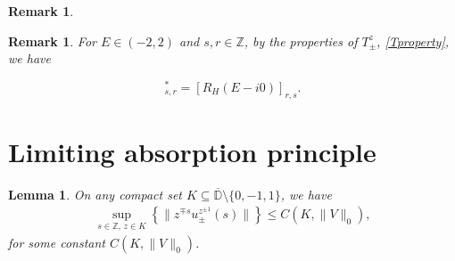 \documentclass[12pt,oneside,onecolumn,open]{article}
\newtheorem{obs}[teo]{Remark}
\newtheorem{lema}[teo]{Lemma}
\begin{document}
\begin{obs}
\end{obs}

\begin{obs} For $E\in  (-2,2)$ and  $s,r\in \mathbb{Z}$, by the properties of $T^{z}_\pm $, \eqref{Tproperty}, we have


\begin{equation}
    [R_{H}(E + i0 )]_{s,r}^{*}=[R_{H}(E - i0 )]_{r,s}.
    \label{eq:simetria}
\end{equation}
\end{obs}
 




 \section{Limiting absorption principle}\label{sectionLAP}



 \begin{lema}\label{LAP1}
  On any compact set \(K \subseteq \overline{\mathbb{D}} \setminus \{0, -1,  1\}\), we have
    \begin{align}\label{i1}
        \sup _{s \in \mathbb{Z}, \, z \in K} \left\{ \| z^{\mp s} u_{\pm }^{z^{\pm 1}}(s) \| \right\} \leq C(K, \| V \|_0),
    \end{align} for some constant  $C(K, \| V \|_0)$. 
\end{lema}
\end{document}

